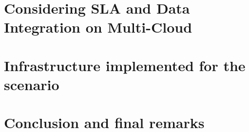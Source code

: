 \documentclass{llncs}
\begin{document}

  







\section{Considering SLA and Data Integration on Multi-Cloud}

\section{Infrastructure implemented for the scenario}

\section{Conclusion and final remarks}\label{sec:conc}




\end{document}
